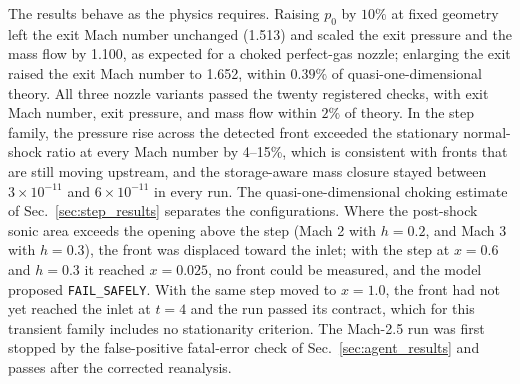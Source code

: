 \documentclass[11pt]{article}
\begin{document}
The results behave as the physics requires. Raising $p_0$ by $10\%$ at fixed
geometry left the exit Mach number unchanged (1.513) and scaled the exit
pressure and the mass flow by 1.100, as expected for a choked perfect-gas
nozzle; enlarging the exit raised the exit Mach number to 1.652, within
$0.39\%$ of quasi-one-dimensional theory. All three nozzle variants passed
the twenty registered checks, with exit Mach number, exit pressure, and mass
flow within $2\%$ of theory. In the
step family, the pressure rise across the detected front exceeded the
stationary normal-shock ratio at every Mach number by 4--15\%, which is
consistent with fronts that are still moving upstream, and the storage-aware
mass closure stayed between $3\times10^{-11}$ and $6\times10^{-11}$ in every
run. The quasi-one-dimensional choking estimate of Sec.~\ref{sec:step_results}
separates the configurations. Where the post-shock sonic area exceeds the
opening above the step (Mach 2 with $h=0.2$, and Mach 3 with $h=0.3$), the
front was displaced toward the inlet; with the step at $x=0.6$ and $h=0.3$
it reached $x=0.025$, no front could be measured, and the model proposed
\texttt{FAIL\_SAFELY}. With the same step moved to $x=1.0$, the front had not
yet reached the inlet at $t=4$ and the run passed its contract, which for
this transient family includes no stationarity criterion. The Mach-2.5 run
was first stopped by the false-positive fatal-error check of
Sec.~\ref{sec:agent_results} and passes after the corrected reanalysis.
\end{document}
